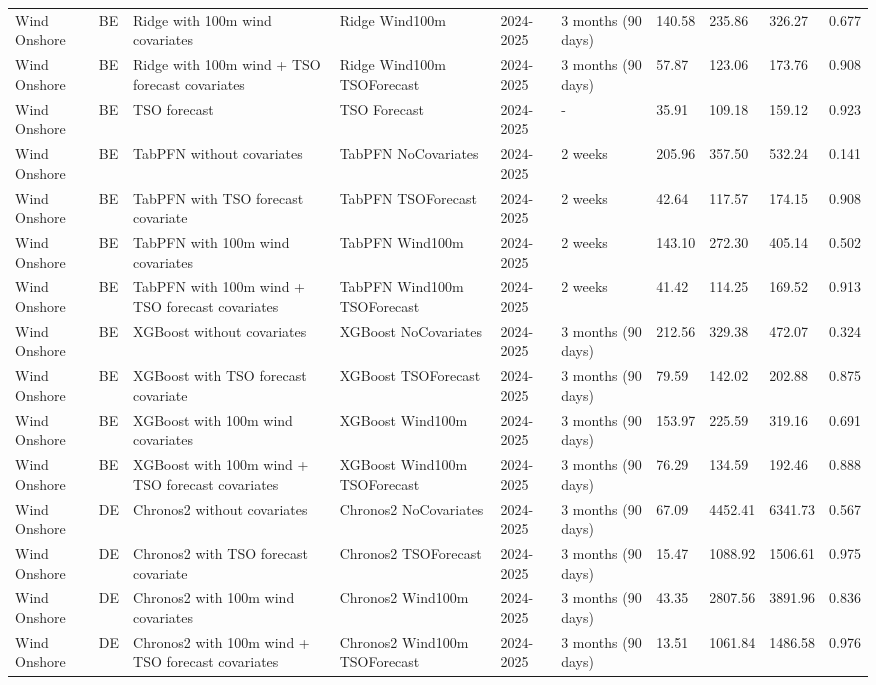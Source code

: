 \begin{longtable}{llllllllll}
Wind Onshore & BE & Ridge with 100m wind covariates & Ridge Wind100m & 2024-2025 & 3 months (90 days) & 140.58 & 235.86 & 326.27 & 0.677 \\
Wind Onshore & BE & Ridge with 100m wind + TSO forecast covariates & Ridge Wind100m TSOForecast & 2024-2025 & 3 months (90 days) & 57.87 & 123.06 & 173.76 & 0.908 \\
Wind Onshore & BE & TSO forecast & TSO Forecast & 2024-2025 & - & 35.91 & 109.18 & 159.12 & 0.923 \\
Wind Onshore & BE & TabPFN without covariates & TabPFN NoCovariates & 2024-2025 & 2 weeks & 205.96 & 357.50 & 532.24 & 0.141 \\
Wind Onshore & BE & TabPFN with TSO forecast covariate & TabPFN TSOForecast & 2024-2025 & 2 weeks & 42.64 & 117.57 & 174.15 & 0.908 \\
Wind Onshore & BE & TabPFN with 100m wind covariates & TabPFN Wind100m & 2024-2025 & 2 weeks & 143.10 & 272.30 & 405.14 & 0.502 \\
Wind Onshore & BE & TabPFN with 100m wind + TSO forecast covariates & TabPFN Wind100m TSOForecast & 2024-2025 & 2 weeks & 41.42 & 114.25 & 169.52 & 0.913 \\
Wind Onshore & BE & XGBoost without covariates & XGBoost NoCovariates & 2024-2025 & 3 months (90 days) & 212.56 & 329.38 & 472.07 & 0.324 \\
Wind Onshore & BE & XGBoost with TSO forecast covariate & XGBoost TSOForecast & 2024-2025 & 3 months (90 days) & 79.59 & 142.02 & 202.88 & 0.875 \\
Wind Onshore & BE & XGBoost with 100m wind covariates & XGBoost Wind100m & 2024-2025 & 3 months (90 days) & 153.97 & 225.59 & 319.16 & 0.691 \\
Wind Onshore & BE & XGBoost with 100m wind + TSO forecast covariates & XGBoost Wind100m TSOForecast & 2024-2025 & 3 months (90 days) & 76.29 & 134.59 & 192.46 & 0.888 \\
Wind Onshore & DE & Chronos2 without covariates & Chronos2 NoCovariates & 2024-2025 & 3 months (90 days) & 67.09 & 4452.41 & 6341.73 & 0.567 \\
Wind Onshore & DE & Chronos2 with TSO forecast covariate & Chronos2 TSOForecast & 2024-2025 & 3 months (90 days) & 15.47 & 1088.92 & 1506.61 & 0.975 \\
Wind Onshore & DE & Chronos2 with 100m wind covariates & Chronos2 Wind100m & 2024-2025 & 3 months (90 days) & 43.35 & 2807.56 & 3891.96 & 0.836 \\
Wind Onshore & DE & Chronos2 with 100m wind + TSO forecast covariates & Chronos2 Wind100m TSOForecast & 2024-2025 & 3 months (90 days) & 13.51 & 1061.84 & 1486.58 & 0.976 \\

\end{longtable}
